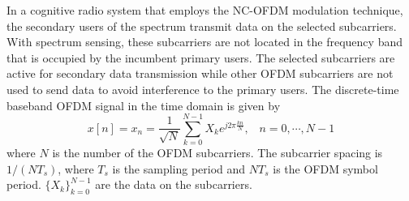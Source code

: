 \documentclass[paper]{ieice}
\begin{document}
In a cognitive radio system that employs the NC-OFDM modulation technique, the secondary users of the spectrum transmit data on the selected subcarriers.  With spectrum sensing, these subcarriers are not located in the frequency band that is occupied by the incumbent primary users.  The selected subcarriers are active for secondary data transmission while other OFDM subcarriers are not used to send data to avoid interference to the primary users.  The discrete-time baseband OFDM signal in the time domain is given by
\begin{equation} \label{eq:time_domain_signal}
x[n] = x_n = \frac{1}{\sqrt{N}} \sum_{k=0}^{N-1} X_{k} e^{j 2 \pi \frac{kn}{N}}, \,~~~ n = 0, \cdots, N-1
\end{equation}
where $N$ is the number of the OFDM subcarriers. The subcarrier spacing is $1/(NT_s)$, where $T_s$ is the sampling period and $NT_s$ is the OFDM symbol period.  $\{X_{k}\}_{k=0}^{N-1}$ are the data on the subcarriers. 
\end{document}
